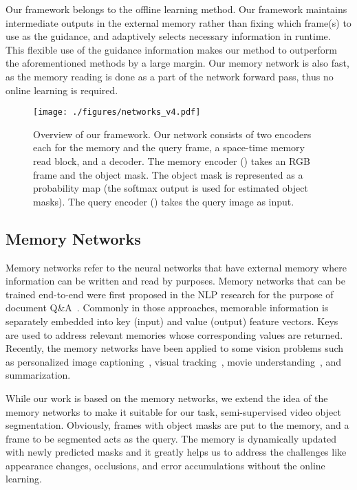 \documentclass[10pt,twocolumn,letterpaper]{article}
\begin{document}
Our framework belongs to the offline learning method. 
Our framework maintains intermediate outputs in the external memory rather than fixing which frame(s) to use as the guidance, and adaptively selects necessary information in runtime.
This flexible use of the guidance information makes our method to outperform the aforementioned methods by a large margin.
Our memory network is also fast, as the memory reading is done as a part of the network forward pass, thus no online learning is required.


















\begin{figure*}
\centering
\texttt{[image: ./figures/networks\_v4.pdf]}
\caption{Overview of our framework. Our network consists of two encoders each for the memory and the query frame, a space-time memory read block, and a decoder. The memory encoder () takes an RGB frame and the object mask. The object mask is represented as a probability map (the softmax output is used for estimated object masks). The query encoder () takes the query image as input.}
\label{Fig:networks}
\end{figure*}


\subsection{Memory Networks}
Memory networks refer to the neural networks that have external memory where information can be written and read by purposes.
Memory networks that can be trained end-to-end were first proposed in the NLP research for the purpose of document Q\&A~\cite{sukhbaatar2015end, miller2016key,kumar2016ask}.
Commonly in those approaches, memorable information is separately embedded into key (input) and value (output) feature vectors.
Keys are used to address relevant memories whose corresponding values are returned. 
Recently, the memory networks have been applied to some vision problems such as personalized image captioning~\cite{park2017attend}, visual tracking~\cite{yang2018learning}, movie understanding~\cite{na2017read}, and summarization\cite{lee2018memory}.

While our work is based on the memory networks, we extend the idea of the memory networks to make it suitable for our task, semi-supervised video object segmentation. 
Obviously, frames with object masks are put to the memory, and a frame to be segmented acts as the query. 
The memory is dynamically updated with newly predicted masks and it greatly helps us to address the challenges like appearance changes, occlusions, and error accumulations without the online learning.
\end{document}
